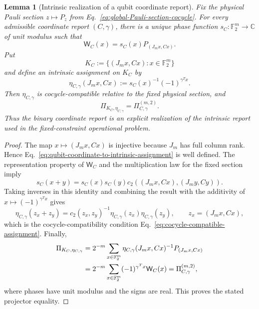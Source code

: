 \documentclass[11pt]{article}
\newcommand{\F}{\mathbb F}
\newcommand{\1}{\mathbf 1}
\theoremstyle{plain}
\newtheorem{lemma}[theorem]{Lemma}
\theoremstyle{definition}
\theoremstyle{remark}
\begin{document}
\begin{lemma}[Intrinsic realization of a qubit coordinate report]
\label{lem:qubit-intrinsic-coordinate-report-bridge}
Fix the physical Pauli section $z\mapsto P_z$ from
Eq.~\eqref{eq:global-Pauli-section-cocycle}.  For every admissible coordinate
report $(C,\gamma)$, there is a unique phase function
$s_C:\F_2^m\to\mathbb C$ of unit modulus such that
\begin{equation}
 \mathsf W_C(x)=s_C(x)P_{(J_mx,Cx)}.
 \label{eq:qubit-coordinate-to-physical-section-phase}
\end{equation}
Put
\begin{equation}
 K_C:=\{(J_mx,Cx):x\in\F_2^m\}
 \label{eq:qubit-coordinate-report-subspace}
\end{equation}
and define an intrinsic assignment on $K_C$ by
\begin{equation}
 \eta_{C,\gamma}(J_mx,Cx)
 :=s_C(x)^{-1}(-1)^{\gamma^Tx}.
 \label{eq:qubit-coordinate-to-intrinsic-assignment}
\end{equation}
Then $\eta_{C,\gamma}$ is cocycle-compatible relative to the fixed physical
section, and
\begin{equation}
 \Pi_{K_C,\eta_{C,\gamma}}=\Pi_{C,\gamma}^{(m,2)}.
 \label{eq:qubit-intrinsic-coordinate-projector-equality}
\end{equation}
Thus the binary coordinate report is an explicit realization of the intrinsic
report used in the fixed-constraint operational problem.
\end{lemma}
\begin{proof}
The map $x\mapsto(J_mx,Cx)$ is injective because $J_m$ has full column rank.
Hence Eq.~\eqref{eq:qubit-coordinate-to-intrinsic-assignment} is well defined.
The representation property of $\mathsf W_C$ and the multiplication law for
the fixed section imply
\begin{equation}
 s_C(x+y)
 =s_C(x)s_C(y)c_2((J_mx,Cx),(J_my,Cy)).
 \label{eq:qubit-bridge-section-cocycle-relation}
\end{equation}
Taking inverses in this identity and combining the result with the additivity
of $x\mapsto(-1)^{\gamma^Tx}$ gives
\[
 \eta_{C,\gamma}(z_x+z_y)
 =c_2(z_x,z_y)^{-1}\eta_{C,\gamma}(z_x)\eta_{C,\gamma}(z_y),
 \qquad z_x=(J_mx,Cx),
\]
which is the cocycle-compatibility condition
Eq.~\eqref{eq:cocycle-compatible-assignment}.  Finally,
\begin{align}
 \Pi_{K_C,\eta_{C,\gamma}}
 &=2^{-m}\sum_{x\in\F_2^m}
   \eta_{C,\gamma}(J_mx,Cx)^{-1}P_{(J_mx,Cx)}\notag\\
 &=2^{-m}\sum_{x\in\F_2^m}(-1)^{\gamma^Tx}\mathsf W_C(x)
 =\Pi_{C,\gamma}^{(m,2)},
 \label{eq:qubit-bridge-projector-calculation}
\end{align}
where phases have unit modulus and the signs are real.  This proves the stated
projector equality.
\end{proof}
\end{document}
